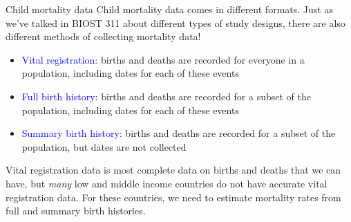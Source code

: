 \documentclass[10pt,t]{beamer}
\begin{document}
\begin{frame}{Child mortality data}
Child mortality data comes in different formats. Just as we've talked in BIOST 311 about different types of study designs, there are also different methods of collecting mortality data!

\vspace{0.3cm}

\begin{itemize}
	\item \textcolor{blue}{Vital registration}: births and deaths are recorded for everyone in a population, including dates for each of these events
	\item \textcolor{blue}{Full birth history}: births and deaths are recorded for a subset of the population, including dates for each of these events
	\item \textcolor{blue}{Summary birth history}: births and deaths are recorded for a subset of the population, but dates are not collected
\end{itemize}

\vspace{0.3cm}

\pause Vital registration data is most complete data on births and deaths that we can have, but \textit{many} low and middle income countries do not have accurate vital registration data. For these countries, we need to estimate mortality rates from full and summary birth histories.
\end{frame}
\end{document}
